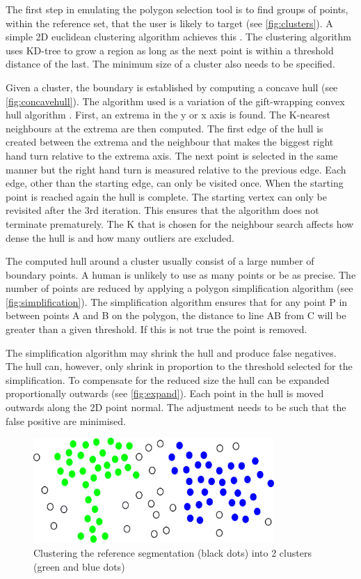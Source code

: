 The first step in emulating the polygon selection tool is to find groups of points, within the reference set, that the user is likely to target (see \autoref{fig:clusters}). A simple 2D euclidean clustering algorithm achieves this \cite{Rusu2009a}. The clustering algorithm uses KD-tree to grow a region as long as the next point is within a threshold distance of the last. The minimum size of a cluster also needs to be specified.

Given a cluster, the boundary is established by computing a concave hull \cite{Moreira2006} (see \autoref{fig:concavehull}). The algorithm used is a variation of the gift-wrapping convex hull algorithm \cite{Jarvis1973}. First, an extrema in the y or x axis is found. The K-nearest neighbours at the extrema are then computed. The first edge of the hull is created between the extrema and the neighbour that makes the biggest right hand turn relative to the extrema axis. The next point is selected in the same manner but the right hand turn is measured relative to the previous edge. Each edge, other than the starting edge, can only be visited once. When the starting point is reached again the hull is complete. The starting vertex can only be revisited after the 3rd iteration. This ensures that the algorithm does not terminate prematurely. The K that is chosen for the neighbour search affects how dense the hull is and how many outliers are excluded.

The computed hull around a cluster usually consist of a large number of boundary points. A human is unlikely to use as many points or be as precise. The number of points are reduced by applying a polygon simplification algorithm \cite{Ramer1972} (see \autoref{fig:simplification}). The simplification algorithm ensures that for any point P in between points A and B on the polygon, the distance to line AB from C will be greater than a given threshold. If this is not true the point is removed.

The simplification algorithm may shrink the hull and produce false negatives. The hull can, however, only shrink in proportion to the threshold selected for the simplification. To compensate for the reduced size the hull can be expanded proportionally outwards (see \autoref{fig:expand}). Each point in the hull is moved outwards along the 2D point normal. The adjustment needs to be such that the false positive are minimised.


\begin{figure}
\centering
\includegraphics[height=4cm]{images/evaltool/scan.png}
\caption[Clustering step]{Clustering the reference segmentation (black dots) into 2 clusters (green and blue dots)}\label{fig:clusters}
\end{figure}


